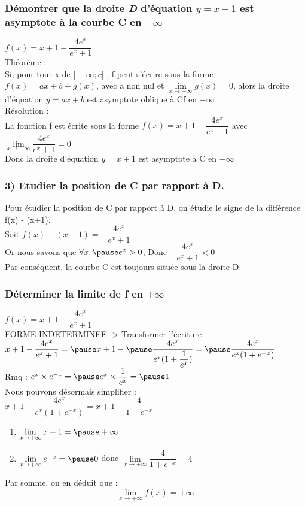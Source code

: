 \documentclass[t]{beamer}
\begin{document}
\begin{frame}
\frametitle{Démontrer que la droite \textit{D} d'équation $y=x+1$ est asymptote à la courbe C en $ -\infty $}
\( f(x)= x + 1 - \dfrac{4e^x}{e^x+1} \)
\\
Théorème :
\\
Si, pour tout x de \pause 
$]- \infty ; c]$
, f peut s'écrire sous la forme
\pause
$f(x) = ax+b + g(x)$,
\pause
avec a non nul et 
\pause
\( \lim\limits_{ x \rightarrow - \infty } g(x) = 0 \),
\pause
alors la droite d'équation $ y = ax+b $ est asymptote oblique à Cf en $ - \infty $
\\
Résolution :
\\
La fonction f est écrite sous la forme $ f(x) = x +1 - \dfrac{4e^x}{e^x+1}$ avec 
\( \lim\limits_{ x \rightarrow - \infty } \dfrac{4e^x}{e^x+1} = 0 \)
\\
\pause
Donc la droite d'équation $y=x+1$ est asymptote à C en $ -\infty $ 
\end{frame}

\begin{frame}
\frametitle{3) Etudier la position de C par rapport à D.}
Pour étudier la position de C par rapport à D, on étudie le signe de la différence f(x) - (x+1).
\\
\pause
Soit \( f(x)-(x-1)= - \dfrac{4e^x}{e^x+1} \)
\\
\pause
Or nous savons que $ \forall x, \pause e^x > 0$,
\pause
Donc \( - \dfrac{4e^x}{e^x+1} < 0 \)
\\
\pause
Par conséquent, \pause
la courbe C est toujours située sous la droite D.

\end{frame}

\begin{frame}
\frametitle{Déterminer la limite de f en $ + \infty $}
\( f(x)= x + 1 - \dfrac{4e^x}{e^x+1} \)
\\
\pause
FORME INDETERMINEE -> Transformer l'écriture
\\
\pause
\( x + 1 - \dfrac{4e^x}{e^x+1} = \pause x + 1 - \pause \dfrac{4e^x}{e^x(1+\dfrac{1}{e^x})} = \pause \dfrac{4e^x}{e^x(1+e^{-x})} \)
\\
\pause
Rmq : \( e^x \times e^{-x} = \pause e^x \times \dfrac{1}{e^x} = \pause 1\)
\\
\pause
Nous pouvons désormais simplifier :
\\
\pause
\( x + 1 - \dfrac{4e^x}{e^x(1+e^{-x})} = x + 1 - \dfrac{4}{1+e^{-x}} \)
\\
\pause
\begin{enumerate}[]
\item \( \lim\limits_{ x \rightarrow + \infty } x + 1 = \pause + \infty \) 
\pause
\item \( \lim\limits_{ x \rightarrow + \infty } e^{-x} = \pause 0 \) \pause donc \( \lim\limits_{ x \rightarrow + \infty } \dfrac{4}{1+e^{-x}} = 4 \)
\pause
\end{enumerate}
Par somme, \pause on en déduit que :
\[ \lim\limits_{ x \rightarrow + \infty } f(x) = + \infty \]
\end{frame}
\end{document}
